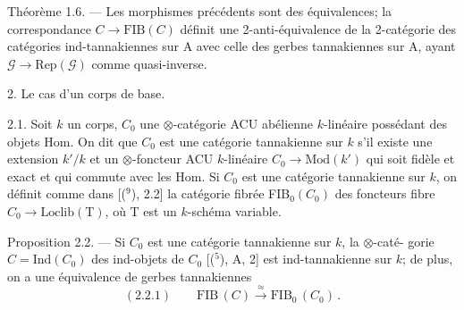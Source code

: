 Théorème 1.6. --- Les morphismes précédents sont des équivalences; la
correspondance $C \to \mathrm{FIB}(C)$ définit une 2-anti-équivalence de la 2-catégorie
des catégories ind-tannakiennes sur A avec celle des gerbes tannakiennes sur A,
ayant $\mathcal{G} \to \mathrm{Rep}(\mathcal{G})$ comme quasi-inverse.

2. Le cas d'un corps de base.

2.1. Soit $k$ un corps, $C_0$ une $\otimes$-catégorie ACU abélienne $k$-linéaire
possédant des objets Hom. On dit que $C_0$ est une catégorie tannakienne
sur $k$ s'il existe une extension $k'/k$ et un $\otimes$-foncteur ACU $k$-linéaire
$C_0 \to \mathrm{Mod}(k')$ qui soit fidèle et exact et qui commute avec les Hom. Si $C_0$
est une catégorie tannakienne sur $k$, on définit comme dans [(${}^{9}$), 2.2] la
catégorie fibrée FIB$_0(C_0)$ des foncteurs fibre $C_0 \to \mathrm{Loclib}(\mathrm{T})$, où T est un
$k$-schéma variable.

Proposition 2.2. --- Si $C_0$ est une catégorie tannakienne sur $k$, la $\otimes$-caté-%
gorie $C = \mathrm{Ind}(C_0)$ des ind-objets de $C_0$ [(${}^{5}$), A, 2] est ind-tannakienne
sur $k$; de plus, on a une équivalence de gerbes tannakiennes
\[ (2.2.1) \qquad \mathrm{FIB}\,(C) \xrightarrow{\approx} \mathrm{FIB}_0\,(C_0)\,. \]

